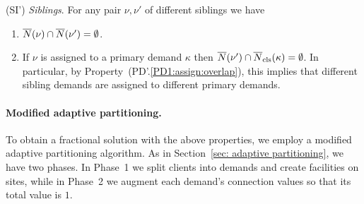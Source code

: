 \begin{description}
\begin{enumerate}
	\end{enumerate}
	
\item{(SI')} \emph{Siblings}. For any pair $\nu,\nu'$ of different siblings we have
  \begin{enumerate}

	\item \label{SI1:siblings disjoint}
		  ${\overline{N}}(\nu)\cap {\overline{N}}(\nu') = \emptyset$.
		
	\item \label{SI1:primary disjoint} If $\nu$ is assigned to a primary demand $\kappa$ then
 		${\overline{N}}(\nu')\cap {\overline{N}}_{\text{cls}}(\kappa) = \emptyset$. In particular, by Property~(PD'.\ref{PD1:assign:overlap}),
		this implies that different sibling demands are assigned to different primary demands.

	\end{enumerate}
	
\end{description}


\paragraph{Modified adaptive partitioning.}
To obtain a fractional solution with the above properties,
we employ a modified adaptive partitioning algorithm. As
in Section~\ref{sec: adaptive partitioning}, we have two phases.
In Phase~1 we split clients into demands and create facilities on
sites, while in Phase~2 we augment each demand's
connection values so that its total value is $1$.

